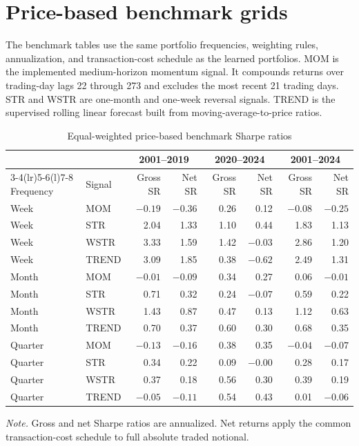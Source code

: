 \FloatBarrier

\section{Price-based benchmark grids}\label{app:benchmark_grids}

The benchmark tables use the same portfolio frequencies, weighting rules, annualization, and transaction-cost schedule as the learned portfolios. MOM is the implemented medium-horizon momentum signal. It compounds returns over trading-day lags 22 through 273 and excludes the most recent 21 trading days. STR and WSTR are one-month and one-week reversal signals. TREND is the supervised rolling linear forecast built from moving-average-to-price ratios.

\begin{table}[htbp]
\centering
\caption{Equal-weighted price-based benchmark Sharpe ratios}
\label{tab:app_benchmark_ew}
\scriptsize
\setlength{\tabcolsep}{4.6pt}
\begin{tabular}{@{}llrrrrrr@{}}
\toprule
& & \multicolumn{2}{c}{2001--2019} & \multicolumn{2}{c}{2020--2024} & \multicolumn{2}{c}{2001--2024} \\
\cmidrule(lr){3-4}\cmidrule(lr){5-6}\cmidrule(l){7-8}
Frequency & Signal & Gross SR & Net SR & Gross SR & Net SR & Gross SR & Net SR \\
\midrule
Week & MOM   & $-0.19$ & $-0.36$ & 0.26 & 0.12 & $-0.08$ & $-0.25$ \\
Week & STR   & 2.04 & 1.33 & 1.10 & 0.44 & 1.83 & 1.13 \\
Week & WSTR  & 3.33 & 1.59 & 1.42 & $-0.03$ & 2.86 & 1.20 \\
Week & TREND & 3.09 & 1.85 & 0.38 & $-0.62$ & 2.49 & 1.31 \\
\addlinespace[2pt]
Month & MOM   & $-0.01$ & $-0.09$ & 0.34 & 0.27 & 0.06 & $-0.01$ \\
Month & STR   & 0.71 & 0.32 & 0.24 & $-0.07$ & 0.59 & 0.22 \\
Month & WSTR  & 1.43 & 0.87 & 0.47 & 0.13 & 1.12 & 0.63 \\
Month & TREND & 0.70 & 0.37 & 0.60 & 0.30 & 0.68 & 0.35 \\
\addlinespace[2pt]
Quarter & MOM   & $-0.13$ & $-0.16$ & 0.38 & 0.35 & $-0.04$ & $-0.07$ \\
Quarter & STR   & 0.34 & 0.22 & 0.09 & $-0.00$ & 0.28 & 0.17 \\
Quarter & WSTR  & 0.37 & 0.18 & 0.56 & 0.30 & 0.39 & 0.19 \\
Quarter & TREND & $-0.05$ & $-0.11$ & 0.54 & 0.43 & 0.01 & $-0.06$ \\
\bottomrule
\end{tabular}
\begin{minipage}{\textwidth}
\footnotesize\textit{Note.} Gross and net Sharpe ratios are annualized. Net returns apply the common transaction-cost schedule to full absolute traded notional.
\end{minipage}
\end{table}


